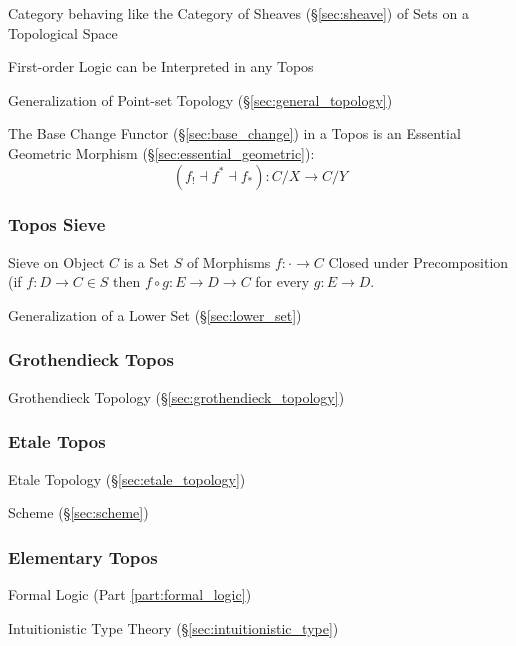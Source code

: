 Category behaving like the Category of Sheaves (\S\ref{sec:sheave})
of Sets on a Topological Space

First-order Logic can be Interpreted in any Topos

Generalization of Point-set Topology (\S\ref{sec:general_topology})

The Base Change Functor (\S\ref{sec:base_change}) in a Topos is an
Essential Geometric Morphism (\S\ref{sec:essential_geometric}):
\[
  (f_! \dashv f^* \dashv f_*):C/X \rightarrow C/Y
\]



\subsubsection{Topos Sieve}\label{sec:topos_sieve}

Sieve on Object $C$ is a Set $S$ of Morphisms $f : \cdot \rightarrow
C$ Closed under Precomposition (if $f : D \rightarrow C \in S$ then $f
\circ g : E \rightarrow D \rightarrow C$ for every $g : E \rightarrow
D$.

Generalization of a Lower Set (\S\ref{sec:lower_set})



\subsubsection{Grothendieck Topos}\label{sec:grothendieck_topos}

Grothendieck Topology (\S\ref{sec:grothendieck_topology})



\subsubsection{Etale Topos}\label{sec:etale_topos}

Etale Topology (\S\ref{sec:etale_topology})

Scheme (\S\ref{sec:scheme})



\subsubsection{Elementary Topos}\label{sec:elementary_topos}

Formal Logic (Part \ref{part:formal_logic})

Intuitionistic Type Theory (\S\ref{sec:intuitionistic_type})




